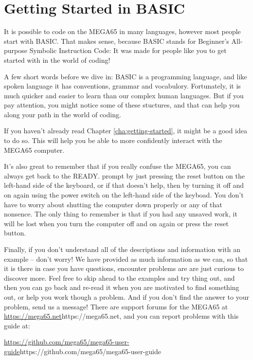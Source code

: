 \chapter{Getting Started in BASIC}
\label{cha:basic-getting-started}

It is possible to code on the MEGA65 in many languages,
however most people start with BASIC.  That makes sense,
because BASIC stands for Beginner's All-purpose Symbolic
Instruction Code: It was made for people like you to get
started with in the world of coding!

A few short words before we dive in: BASIC is a programming
language, and like spoken language it has conventions, grammar
and vocabulory.  Fortunately, it is much quicker and easier
to learn than our complex human languages. But if you pay
attention, you might notice some of these stuctures, and that
can help you along your path in the world of coding.

If you haven't already read Chapter \ref{cha:getting-started},
it might be a good idea to do so. This will help you be able to
more confidently interact with the MEGA65 computer.

It's also great to remember that if you really confuse the MEGA65,
you can always get back to the READY. prompt by just pressing the
reset button on the left-hand side of the keyboard, or if that
doesn't help, then by turning it off
and on again using the power switch on the left-hand side of the keyboad.
You don't have to worry about shutting the computer
down properly or any of that nonsence.  The only thing to remember
is that if you had any unsaved work, it will be lost when you turn
the computer off and on again or press the reset button.

Finally, if you don't understand all of the descriptions and information
with an example -- don't worry! We have provided as much information
as we can, so that it is there in case you have questions, encounter problems are are
just curious to discover more.  Feel free to skip ahead to the examples
and try thing out, and then you can go back and re-read it when you are motivated
to find something out, or help you work though a problem.  And if you don't find
the answer to your problem, send us a message!  There are support forums for the
MEGA65 at \url{https://mega65.net}{https://mega65.net}, and you can
report problems with this guide at:

\url{https://github.com/mega65/mega65-user-guide}{https://github.com/mega65/mega65-user-guide}

